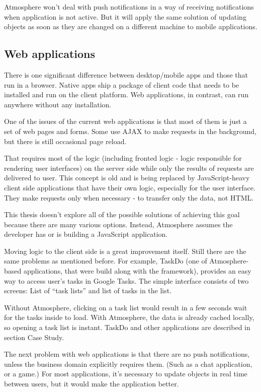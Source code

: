 Atmosphere won’t deal with push notifications in a way of receiving notifications when application is not active. But it will apply the same solution of updating objects as soon as they are changed on a different machine to mobile applications. 

\subsection{Web applications}

There is one significant difference between desktop/mobile apps and those that run in a browser. Native apps ship a package of client code that needs to be installed and run on the client platform. Web applications, in contrast, can run anywhere without any installation.

One of the issues of the current web applications is that most of them is just a set of web pages and forms. Some use AJAX to make requests in the background, but there is still occasional page reload.

That requires most of the logic (including fronted logic - logic responsible for rendering user interfaces) on the server side while only the results of requests are delivered to user. This concept is old \citep{html_history} and is being replaced by JavaScript-heavy client side applications that have their own logic, especially for the user interface. They make requests only when necessary - to transfer only the data, not HTML.

This thesis doesn’t explore all of the possible solutions of achieving this goal because there are many various options. Instead, Atmosphere assumes the developer has or is building a JavaScript application.

Moving logic to the client side is a great improvement itself. Still there are the same problems as mentioned before. For example, TaskDo (one of Atmosphere-based applications, that were build along with the framework), provides an easy way to access user's tasks in Google Tasks. The simple interface consists of two screens: List of ``task lists'' and list of tasks in the list.

Without Atmosphere, clicking on a task list would result in a few seconds wait for the tasks inside to load. With Atmosphere, the data is already cached locally, so opening a task list is instant. TaskDo and other applications are described in section Case Study.

The next problem with web applications is that there are no push notifications, unless the business domain explicitly requires them. (Such as a chat application, or a game.) For most applications, it's necessary to update objects  in real time between users, but it would make the application better.